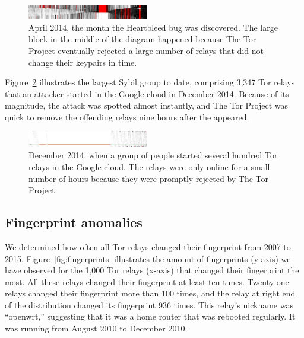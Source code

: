 \begin{figure}[t]
	\centering
	\includegraphics[width=0.47\textwidth]{diagrams/heartbleed-uptimes.jpg}
	\caption{April 2014, the month the Heartbleed bug was discovered.
		The large block in the middle of the diagram happened because The
		Tor Project eventually rejected a large number of relays that did not
		change their keypairs in time.}
		\label{fig:2014-04-heartbleed}
\end{figure}

Figure~\ref{fig:2014-12-lizard} illustrates the largest Sybil group to date,
comprising 3,347 Tor relays that an attacker started in the Google cloud in
December 2014.  Because of its magnitude, the attack was spotted almost
instantly, and The Tor Project was quick to remove the offending relays nine
hours after the appeared.

\begin{figure}[t]
	\centering
	\includegraphics[width=0.47\textwidth]{diagrams/lizard-uptimes.jpg}
	\caption{December 2014, when a group of people started several hundred Tor
	relays in the Google cloud.  The relays were only online for a small number
	of hours because they were promptly rejected by The Tor Project.}
	\label{fig:2014-12-lizard}
\end{figure}

\subsection{Fingerprint anomalies}
\label{sec:fingerprint-anomalies}
We determined how often all Tor relays changed their fingerprint from 2007 to
2015.  Figure~\ref{fig:fingerprints} illustrates the amount of fingerprints
(y-axis) we have observed for the 1,000 Tor relays (x-axis) that changed their
fingerprint the most.  All these relays changed their fingerprint at least ten
times.  Twenty one relays changed their fingerprint more than 100 times, and the
relay at right end of the distribution changed its fingerprint 936 times.  This
relay's nickname was ``openwrt,'' suggesting that it was a home router that was
rebooted regularly.  It was running from August 2010 to December 2010.

